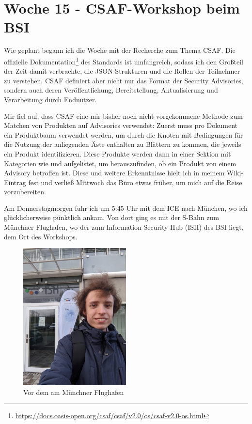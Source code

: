 \section{Woche 15 - CSAF-Workshop beim BSI} \label{sec:bericht-wo-15-initial}


\lweekdaymarginpar{\weekdayMondayShort\ - \weekdayWednesdayShort}

Wie geplant begann ich die Woche mit der Recherche zum Thema CSAF\@.
Die offizielle Dokumentation\footnote{\url{https://docs.oasis-open.org/csaf/csaf/v2.0/os/csaf-v2.0-os.html}} des Standards ist umfangreich, sodass ich den Großteil der Zeit damit verbrachte, die JSON-Strukturen und die Rollen der Teilnehmer zu verstehen.
CSAF definiert aber nicht nur das Format der Security Advisories, sondern auch deren Veröffentlichung, Bereitstellung, Aktualisierung und Verarbeitung durch Endnutzer.

Mir fiel auf, dass CSAF eine mir bisher noch nicht vorgekommene Methode zum Matchen von Produkten auf Advisories verwendet:
Zuerst muss pro Dokument ein Produktbaum verwendet werden, um durch die Knoten mit Bedingungen für die Nutzung der anliegenden Äste enthalten zu Blättern zu kommen, die jeweils ein Produkt identifizieren.
Diese Produkte werden dann in einer Sektion mit Kategorien wie  und  aufgelistet, um herauszufinden, ob ein Produkt von einem Advisory betroffen ist.
Diese und weitere Erkenntnisse hielt ich in meinem Wiki-Eintrag fest und verließ Mittwoch das Büro etwas früher, um mich auf die Reise vorzubereiten.

\sweekdaymarginpar{\weekdayThursdayLong}

Am Donnerstagmorgen fuhr ich um 5:45 Uhr mit dem ICE nach München, wo ich glücklicherweise pünktlich ankam.
Von dort ging es mit der S-Bahn zum Münchner Flughafen, wo der zum Information Security Hub (ISH) des BSI liegt, dem Ort des Workshops.

\begin{figure}[htbp] %
    \centering
    \includegraphics[width=0.5\textwidth, keepaspectratio]{res/img/2023-12-14-yan-vor-dem-ish-muenchen}
    \caption{Vor dem  am Münchner Flughafen}
    \label{fig:yan-ish-csaf-muenchen-initial}
\end{figure}


